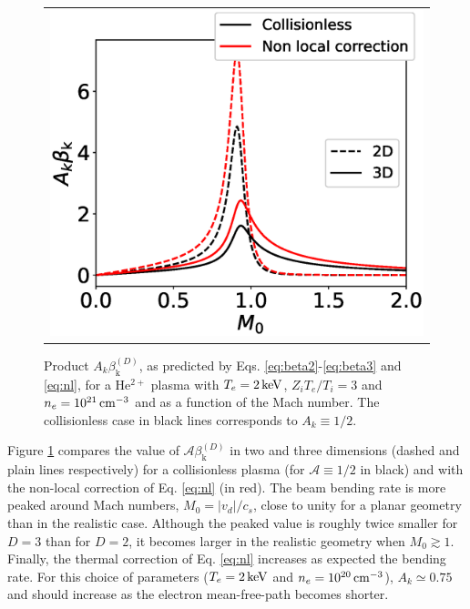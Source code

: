 \documentclass[%
 reprint,
 amsmath,amssymb,
 aps,
]{revtex4-1}
\begin{document}
\begin{figure}
\begin{tabular}{c}
\includegraphics[scale=0.39]{Figure_1.eps}
\end{tabular}
\caption{ \label{fig:2d3dnl}
Product $A_k  \beta_\mathrm{k}^{(D)}$, as predicted by Eqs. \eqref{eq:beta2}-\eqref{eq:beta3} and \eqref{eq:nl},  for a He$^{2+}$ plasma  with $T_e=2\,\rm keV$, $Z_iT_e/T_i=3$ and $n_e=10^{21}\,\rm cm^{-3}$ and as a function of the Mach number.
The collisionless case in black lines corresponds to $A_k\equiv 1/2$.}
\end{figure}

Figure \ref{fig:2d3dnl} compares the value of  $\mathcal{A}  \beta_\mathrm{k}^{(D)}$ in two and three dimensions (dashed and plain lines respectively) for a collisionless plasma (for $\mathcal{A} \equiv1/2$ in black) and with the non-local correction of Eq. \eqref{eq:nl} (in red).  
The beam bending rate is more peaked around Mach numbers, $M_0=\vert v_d\vert /c_s$, close to unity for a planar geometry than in the  realistic case. Although the peaked value is roughly twice smaller for $D=3$ than for $D=2$,  it becomes larger in the realistic geometry when $M_0\gtrsim 1$.
Finally,  the thermal correction of Eq. \eqref{eq:nl} increases as expected the bending rate. For this choice of parameters ($T_e=2\,\rm keV$ and $n_e=10^{20}\,\rm cm^{-3}$), $A_k\simeq 0.75$ and should increase as the electron mean-free-path becomes shorter.
\end{document}
